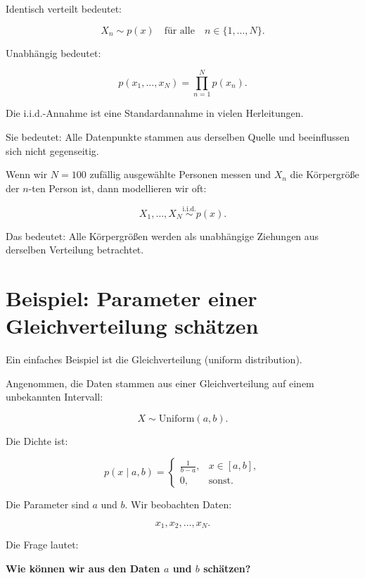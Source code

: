 Identisch verteilt bedeutet:

\[
    X_n \sim p(x)
    \quad
    \text{für alle}
    \quad
    n \in \{1,\dots,N\}.
\]

Unabhängig bedeutet:

\[
    p(x_1,\dots,x_N)
    =
    \prod_{n=1}^{N}
    p(x_n).
\]

\begin{conceptbox}
Die i.i.d.-Annahme ist eine Standardannahme in vielen Herleitungen.

Sie bedeutet:
Alle Datenpunkte stammen aus derselben Quelle und beeinflussen sich nicht gegenseitig.
\end{conceptbox}

\begin{examplebox}
Wenn wir \(N=100\) zufällig ausgewählte Personen messen und \(X_n\) die Körpergröße der \(n\)-ten Person ist, dann modellieren wir oft:

\[
    X_1,\dots,X_N
    \overset{\mathrm{i.i.d.}}{\sim}
    p(x).
\]

Das bedeutet:
Alle Körpergrößen werden als unabhängige Ziehungen aus derselben Verteilung betrachtet.
\end{examplebox}

\section{Beispiel: Parameter einer Gleichverteilung schätzen}

Ein einfaches Beispiel ist die Gleichverteilung (uniform distribution).

Angenommen, die Daten stammen aus einer Gleichverteilung auf einem unbekannten Intervall:

\[
    X \sim \mathrm{Uniform}(a,b).
\]

Die Dichte ist:

\[
    p(x \mid a,b)
    =
    \begin{cases}
        \frac{1}{b-a}, & x \in [a,b], \\
        0, & \text{sonst}.
    \end{cases}
\]

Die Parameter sind \(a\) und \(b\).
Wir beobachten Daten:

\[
    x_1,x_2,\dots,x_N.
\]

Die Frage lautet:

\begin{center}
\textbf{Wie können wir aus den Daten \(a\) und \(b\) schätzen?}
\end{center}

